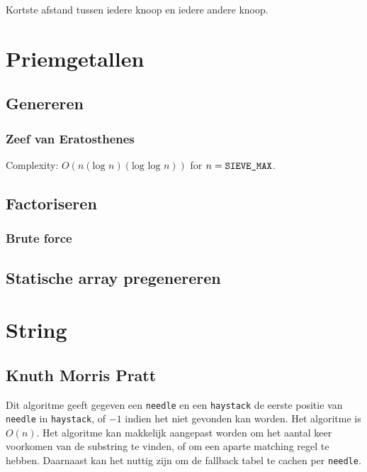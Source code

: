 \documentclass[10pt,hidelinks]{article}
\begin{document}
Kortste afstand tussen iedere knoop en iedere andere knoop.


\section{Priemgetallen}

\subsection{Genereren}

\subsubsection{Zeef van Eratosthenes}

Complexity: $O(n(\text{log }n)(\text{log log }n))$ for $n = \text{\texttt{SIEVE\_MAX}}$.


\subsection{Factoriseren}

\subsubsection{Brute force}



\subsection{Statische array pregenereren}



\section{String}

\subsection{Knuth Morris Pratt}

Dit algoritme geeft gegeven een \texttt{needle} en een \texttt{haystack} de eerste positie van \texttt{needle} in \texttt{haystack}, of $-1$ indien het niet gevonden kan worden. Het algoritme is $O(n)$. Het algoritme kan makkelijk aangepast worden om het aantal keer voorkomen van de substring te vinden, of om een aparte matching regel te hebben. Daarnaast kan het nuttig zijn om de fallback tabel te cachen per \texttt{needle}.
\end{document}
